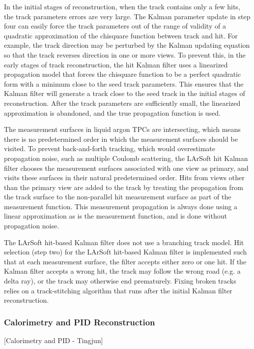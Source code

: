 \documentclass[12pt]{elsarticle}
\newcommand{\larsoft}{LArSoft }
\begin{document}
In the initial
stages of reconstruction, when the track contains only a few hits, the
track parameters errors are very large. The Kalman parameter update in
step four can easily force the track parameters out of the range of
validity of a quadratic approximation of the chisquare function
between track and hit.  For example, the track direction may be
perturbed by the Kalman updating equation so that the
track reverses direction in one or more views.  To prevent
this, in the early stages of track reconstruction, the hit Kalman
filter uses a linearized propagation model that forces the chisquare
function to be a perfect quadratic form with a minimum close to the
seed track parameters.  This ensures that the Kalman filter will
generate a track close to the seed track in the initial stages of
reconstruction.  After the track parameters are sufficiently small,
the linearized approximation is abandoned, and the true propagation
function is used.

The measurement surfaces in liquid argon TPCs are intersecting, which means there is no
predetermined order in which the measurement surfaces should be
visited.  To prevent back-and-forth tracking, which would overestimate
propagation noise, such as multiple Coulomb scattering, the \larsoft
hit Kalman filter chooses the measurement surfaces associated with one
view as primary, and visits these surfaces in their natural
predetermined order.  Hits from views other than the primary view are
added to the track by treating the propagation from the track surface
to the non-parallel hit measurement surface as part of the measurement
function.  This measurement propagation is always done using a linear
approximation as is the measurement function, and is done without
propagation noise.

The \larsoft hit-based Kalman filter
does not use a branching track model. Hit selection (step two) for the \larsoft hit-based Kalman filter is
implemented such that at each measurement surface, the filter accepts
either zero or one hit. If the Kalman filter accepts a wrong hit, the
track may follow the wrong road (e.g. a delta ray), or the track may
otherwise end prematurely.  Fixing broken tracks relies on
a track-stitching algorithm that runs after the initial Kalman
filter reconstruction.

\subsubsection{Calorimetry and PID Reconstruction}
[Calorimetry and PID - Tingjun]
\end{document}
